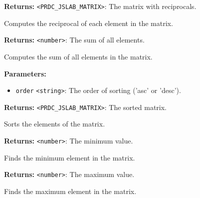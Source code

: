\documentclass[12pt,a4paper]{article}
\begin{document}
\noindent \textbf{Returns:} \texttt{<PRDC\_JSLAB\_MATRIX>}: The matrix with reciprocals.

\noindent Computes the reciprocal of each element in the matrix.

\vspace{5mm}
\noindent {}


\noindent \textbf{Returns:} \texttt{<number>}: The sum of all elements.

\noindent Computes the sum of all elements in the matrix.

\vspace{5mm}
\noindent {}


\noindent \textbf{Parameters:}
\begin{itemize}
  \item \texttt{order} \texttt{<string>}: The order of sorting ('asc' or 'desc').
\end{itemize}

\noindent \textbf{Returns:} \texttt{<PRDC\_JSLAB\_MATRIX>}: The sorted matrix.

\noindent Sorts the elements of the matrix.

\vspace{5mm}
\noindent {}


\noindent \textbf{Returns:} \texttt{<number>}: The minimum value.

\noindent Finds the minimum element in the matrix.

\vspace{5mm}
\noindent {}


\noindent \textbf{Returns:} \texttt{<number>}: The maximum value.

\noindent Finds the maximum element in the matrix.

\vspace{5mm}
\noindent {}
\end{document}
